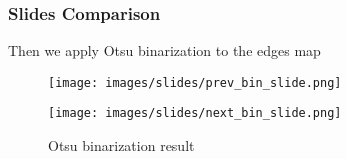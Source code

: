 \begin{frame}
  \frametitle{Slides Comparison}

  Then we apply Otsu binarization to the edges map

  \begin{figure}[ht]
    \begin{minipage}[a]{0.7\linewidth}
        \centering
        \texttt{[image: images/slides/prev\_bin\_slide.png]}
    \end{minipage}
    \hspace{0.5cm}
    \begin{minipage}[b]{0.7\linewidth}
        \centering
        \texttt{[image: images/slides/next\_bin\_slide.png]}
    \end{minipage}
    \caption{Otsu binarization result}
\end{figure}
\end{frame}
